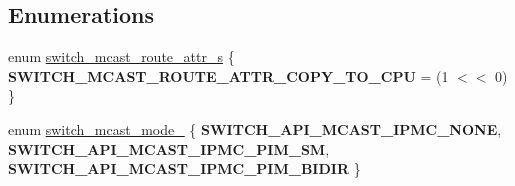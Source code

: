 \subsection*{Enumerations}
\begin{DoxyCompactItemize}
\item 
enum \hyperlink{group__MULTICAST_gac149f82b4265da38bcb13f6745749e2e}{switch\+\_\+mcast\+\_\+route\+\_\+attr\+\_\+s} \{ {\bfseries S\+W\+I\+T\+C\+H\+\_\+\+M\+C\+A\+S\+T\+\_\+\+R\+O\+U\+T\+E\+\_\+\+A\+T\+T\+R\+\_\+\+C\+O\+P\+Y\+\_\+\+T\+O\+\_\+\+C\+P\+U} = (1 $<$$<$ 0)
 \}
\item 
enum \hyperlink{group__MULTICAST_gae6d9578ab942865212c38f150d50cdf8}{switch\+\_\+mcast\+\_\+mode\+\_\+} \{ {\bfseries S\+W\+I\+T\+C\+H\+\_\+\+A\+P\+I\+\_\+\+M\+C\+A\+S\+T\+\_\+\+I\+P\+M\+C\+\_\+\+N\+O\+N\+E}, 
{\bfseries S\+W\+I\+T\+C\+H\+\_\+\+A\+P\+I\+\_\+\+M\+C\+A\+S\+T\+\_\+\+I\+P\+M\+C\+\_\+\+P\+I\+M\+\_\+\+S\+M}, 
{\bfseries S\+W\+I\+T\+C\+H\+\_\+\+A\+P\+I\+\_\+\+M\+C\+A\+S\+T\+\_\+\+I\+P\+M\+C\+\_\+\+P\+I\+M\+\_\+\+B\+I\+D\+I\+R}
 \}
\end{DoxyCompactItemize}
